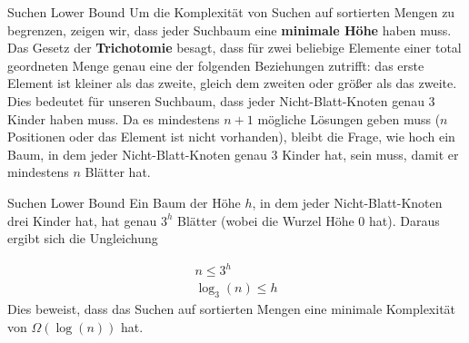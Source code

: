 \begin{frame}{Suchen Lower Bound}
    Um die Komplexität von Suchen auf sortierten Mengen zu begrenzen, zeigen wir, dass jeder Suchbaum eine \textbf{minimale Höhe} haben muss. \\ 
    Das Gesetz der \textbf{Trichotomie} besagt, dass für zwei beliebige Elemente einer total geordneten Menge genau eine der folgenden Beziehungen zutrifft: das erste Element ist kleiner als das zweite, gleich dem zweiten oder größer als das zweite.\\
    Dies bedeutet für unseren Suchbaum, dass jeder Nicht-Blatt-Knoten genau 3 Kinder haben muss. Da es mindestens $n+1$ mögliche Lösungen geben muss ($n$ Positionen oder das Element ist nicht vorhanden), bleibt die Frage, wie hoch ein Baum, in dem jeder Nicht-Blatt-Knoten genau 3 Kinder hat, sein muss, damit er mindestens $n$ Blätter hat. 
\end{frame}

\begin{frame}{Suchen Lower Bound}
    Ein Baum der Höhe $h$, in dem jeder Nicht-Blatt-Knoten drei Kinder hat, hat genau $3^{h}$ Blätter (wobei die Wurzel Höhe 0 hat). Daraus ergibt sich die Ungleichung

    \begin{align*}
        n\leq 3^h\\
        \log_3(n)\leq h
    \end{align*}
    Dies beweist, dass das Suchen auf sortierten Mengen eine minimale Komplexität von $\Omega(\log(n))$ hat.
\end{frame}